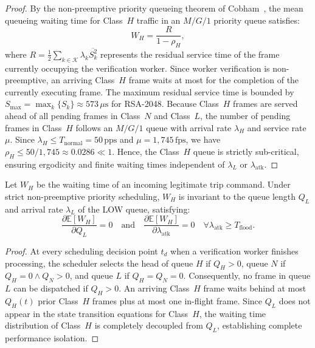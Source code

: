 \documentclass{ieeeaccess}
\begin{document}
\begin{proof}
By the non-preemptive priority queueing theorem of Cobham~\cite{cobham1954priority}, the mean queueing waiting time for Class~$H$ traffic in an $M/G/1$ priority queue satisfies:
\begin{equation}
W_H = \frac{R}{1 - \rho_H},
\end{equation}
where $R = \frac{1}{2} \sum_{k \in \mathcal{K}} \lambda_k \overline{S_k^2}$ represents the residual service time of the frame currently occupying the verification worker. Since worker verification is non-preemptive, an arriving Class~$H$ frame waits at most for the completion of the currently executing frame. The maximum residual service time is bounded by $S_{\max} = \max_{k} \{S_k\} \approx 573\,\mu\text{s}$ for RSA-2048. Because Class~$H$ frames are served ahead of all pending frames in Class~$N$ and Class~$L$, the number of pending frames in Class~$H$ follows an $M/G/1$ queue with arrival rate $\lambda_H$ and service rate $\mu$. Since $\lambda_H \le T_{\text{normal}} = 50\,\text{pps}$ and $\mu = 1{,}745\,\text{fps}$, we have $\rho_H \le 50/1{,}745 \approx 0.0286 \ll 1$. Hence, the Class~$H$ queue is strictly sub-critical, ensuring ergodicity and finite waiting times independent of $\lambda_L$ or $\lambda_{\text{atk}}$.
\end{proof}

\begin{theorem}
\label{thm:isolation}
Let $W_H$ be the waiting time of an incoming legitimate trip command. Under strict non-preemptive priority scheduling, $W_H$ is invariant to the queue length $Q_L$ and arrival rate $\lambda_L$ of the LOW queue, satisfying:
\begin{equation}
\frac{\partial \mathbb{E}[W_H]}{\partial Q_L} = 0 \quad \text{and} \quad \frac{\partial \mathbb{E}[W_H]}{\partial \lambda_{\text{atk}}} = 0 \quad \forall \lambda_{\text{atk}} \ge T_{\text{flood}}.
\end{equation}
\end{theorem}

\begin{proof}
At every scheduling decision point $t_d$ when a verification worker finishes processing, the scheduler selects the head of queue $H$ if $Q_H > 0$, queue $N$ if $Q_H = 0 \land Q_N > 0$, and queue $L$ if $Q_H = Q_N = 0$. Consequently, no frame in queue $L$ can be dispatched if $Q_H > 0$. An arriving Class~$H$ frame waits behind at most $Q_H(t)$ prior Class~$H$ frames plus at most one in-flight frame. Since $Q_L$ does not appear in the state transition equations for Class~$H$, the waiting time distribution of Class~$H$ is completely decoupled from $Q_L$, establishing complete performance isolation.
\end{proof}
\end{document}
